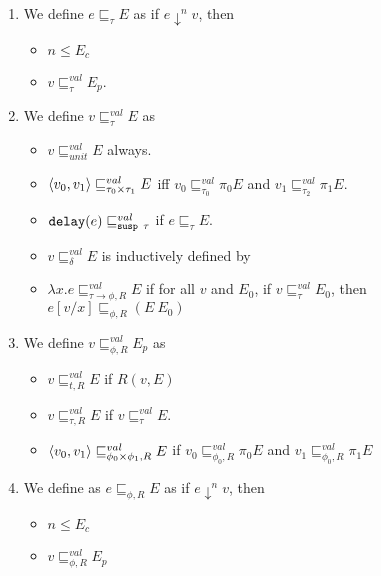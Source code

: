 \begin{defn}\leavevmode
  \label{def:ws_bounding_relations}
\begin{enumerate}
  \item We define $e \sqsubseteq_\tau E$ as if $e \downarrow^n v$, then \label{ws:bounding_rel_defn}
    \begin{itemize}
      \item $n \leq E_c$
      \item $v \sqsubseteq_\tau^{val} E_p$.
    \end{itemize}
  \item We define $v \sqsubseteq_\tau^{val} E$ as
    \begin{itemize}
      \item $v \sqsubseteq_{unit}^{val} E$ always.
      \item $\LP v_0,v_1 \RP \sqsubseteq_{\tau_0 \times \tau_1}^{val} E$ iff $v_0 \sqsubseteq_{\tau_0}^{val} \pi_0 E$ and $v_1 \sqsubseteq_{\tau_2}^{val} \pi_1 E$.
      \item $\T{delay}(e) \sqsubseteq_{\T{susp }\tau}^{val}$ if $e \sqsubseteq_\tau E$.
      \item $v \sqsubseteq_\delta^{val} E$ is inductively defined by
        \begin{prooftree}
        \end{prooftree}
      \item $\lambda x.e \sqsubseteq^{val}_{\tau \to \phi,R} E$ if for all $v$ and $E_0$, if $v \sqsubseteq_\tau^{val} E_0$, then $e[v/x] \sqsubseteq_{\phi,R}(E\ E_0)$
    \end{itemize}
  \item We define $v \sqsubseteq_{\phi,R}^{val} E_p$ as
    \begin{itemize}
      \item $v \sqsubseteq_{t,R}^{val} E $ if $R(v,E)$
      \item $v \sqsubseteq_{\tau,R}^{val} E$ if $v \sqsubseteq_\tau^{val} E$.
      \item $\LP v_0,v_1\RP \sqsubseteq_{\phi_0\times\phi_1,R}^{val} E$ if $v_0 \sqsubseteq_{\phi_0,R}^{val} \pi_0 E$ and $v_1 \sqsubseteq_{\phi_0,R}^{val} \pi_1 E$
    \end{itemize}
  \item We define as $e \sqsubseteq_{\phi,R} E$ as if $e \downarrow^n v$, then
    \begin{itemize}
      \item $n \leq E_c$
      \item $v \sqsubseteq_{\phi,R}^{val} E_p$
    \end{itemize}
\end{enumerate}
\end{defn}
